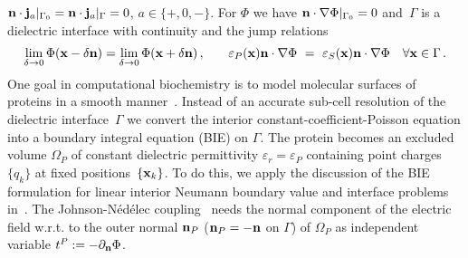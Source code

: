 \documentclass[runningheads]{lncse}
\newcommand{\mydiff}[2]{{}{#2}}
\begin{document}
 $ {\bf n} \cdot{\bf j}_a|_{\Gamma_0} 
 =
 {\bf n} \cdot{\bf j}_a|_{\Gamma} 
   =0$, 
   $  a \in \{+,0,-\} %
$.
%
For $\Phi$ we have ${\bf n} \cdot \nabla \Phi|_{\Gamma_0} = 0$ and~$\Gamma$ is 
a dielectric interface with 
continuity and the jump relations
% 
\begin{eqnarray}
\label{DRS_FEM_BEM_wSciPAL-eq:dPhi-jump}
\lim_{\delta \to 0} \Phi ( {\bf x} - \delta {\bf n} )  =  \lim_{\delta\to 0} \Phi ( {\bf x} + \delta {\bf n})  \,, 
&~~~&
 \varepsilon_P( {\bf x}) {\bf n}\cdot\nabla\Phi ~=~ \varepsilon_S( {\bf x}) {\bf n}\cdot\nabla\Phi
 \quad \forall {\bf x} \in \Gamma\,.
\end{eqnarray}
%
%
One goal in computational biochemistry is to \mydiff{accurately}{} model molecular surfaces of proteins in a smooth manner~\cite{Bajaj20091684}.
%
Instead of an accurate sub-cell resolution of the dielectric interface~$\Gamma$
we 
\mydiff{opt for converting}{convert} the interior constant-coefficient-Poisson equation into a
boundary integral equation (BIE) on $\Gamma$.
%
\mydiff{Thus, the}{The} protein becomes an excluded volume $\Omega_P$ of constant dielectric permittivity $\varepsilon_r = \varepsilon_P$ containing point charges~$\{q_k\}$ at fixed positions~$ \{ {\bf x}_k \}$.
%
To do this, we apply the discussion of the BIE formulation for linear interior Neumann boundary value and interface problems in~\cite{Rjasanow2007book}.
%
\mydiff{To use the}{The} Johnson-N\'ed\'elec 
coupling~\cite{johnson1980coupling} \mydiff{we introduce}{needs} the normal component of the electric field w.r.t. to the outer normal ${\bf n}_P$ (${\bf n}_P = -{\bf n}$ on $\Gamma$) of $\Omega_P$ as independent variable
%
$ t^P   :=  -\partial_{{\bf n}}\Phi $.  %
%
\end{document}

